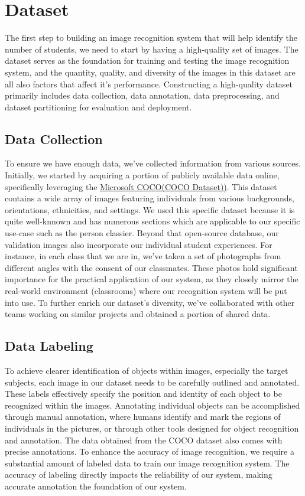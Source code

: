 \section{Dataset}
The first step to building an image recognition system that will help identify the number of students, we need to start by having a high-quality set of images. The dataset serves as the foundation for training and testing the image recognition system, and the quantity, quality, and diversity of the images in this dataset are all also factors that affect it's performance. Constructing a high-quality dataset primarily includes data collection, data annotation, data preprocessing, and dataset partitioning for evaluation and deployment.\\
\label{sec:method}
\subsection{Data Collection}
\label{subsec:method}
To ensure we have enough data, we've collected information from various sources. Initially, we started by acquiring a portion of publicly available data online, specifically leveraging the \href{https://cocodataset.org/#home}{\underline{Microsoft COCO(COCO Dataset))}}. This dataset contains a wide array of images featuring individuals from various backgrounds, orientations, ethnicities, and settings. We used this specific dataset because it is quite well-knnown and has numerous sections which are applicable to our specific use-case such as the person classier. Beyond that open-source database, our validation images also incorporate our individual student experiences. For instance, in each class that we are in, we've taken a set of photographs from different angles with the consent of our classmates. These photos hold significant importance for the practical application of our system, as they closely mirror the real-world environment (classrooms) where our recognition system will be put into use. To further enrich our dataset's diversity, we've collaborated with other teams working on similar projects and obtained a portion of shared data.\\
\label{sec:method}
\subsection{Data Labeling}
\label{subsec:method}
To achieve clearer identification of objects within images, especially the target subjects, each image in our dataset needs to be carefully outlined and annotated. These labels effectively specify the position and identity of each object to be recognized within the images. Annotating individual objects can be accomplished through manual annotation, where humans identify and mark the regions of individuals in the pictures, or through other tools designed for object recognition and annotation. The data obtained from the COCO dataset also comes with precise annotations. To enhance the accuracy of image recognition, we require a substantial amount of labeled data to train our image recognition system. The accuracy of labeling directly impacts the reliability of our system, making accurate annotation the foundation of our system.\\
\label{sec:method}
